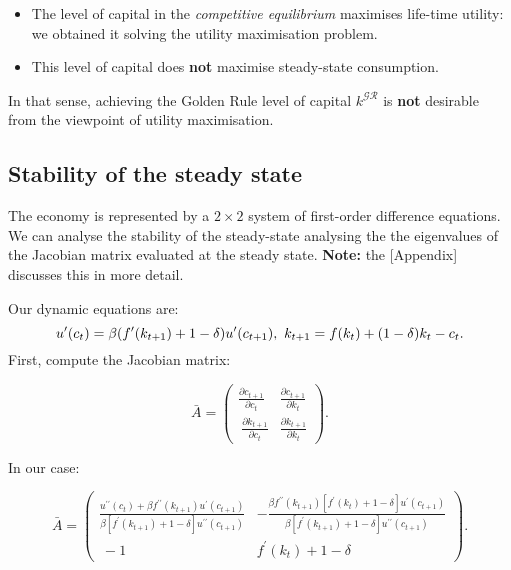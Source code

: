 \documentclass[11pt,a4paper,english]{article}
\providecommand{\tightlist}{%
  \setlength{\itemsep}{0pt}\setlength{\parskip}{0pt}}
\begin{document}
\begin{itemize}
\tightlist
\item
  The level of capital in the \emph{competitive equilibrium} maximises
  life-time utility: we obtained it solving the utility maximisation
  problem.
\item
  This level of capital does \textbf{not} maximise steady-state
  consumption.
\end{itemize}

In that sense, achieving the Golden Rule level of capital
\(k^{\mathcal{GR}}\) is \textbf{not} desirable from the viewpoint of
utility maximisation.

\hypertarget{stability}{%
\subsection{Stability of the steady state}\label{stability}}

The economy is represented by a \(2 \times 2\) system of first-order
difference equations. We can analyse the stability of the steady-state
analysing the the eigenvalues of the Jacobian matrix evaluated at the
steady state. \textbf{Note:} the {[}Appendix{]} discusses this in more
detail.

Our dynamic equations are:
\[ u^{\prime}(c_{t}) = \beta (f^{\prime}(k_{t+1}) + 1 - \delta) u^{\prime}(c_{t+1}), \\\
   k_{t+1} = f(k_{t}) + (1-\delta) k_{t} - c_{t}.
\] First, compute the Jacobian matrix:

\[\bar{A} = \begin{pmatrix}
\frac{\partial c_{t+1}}{\partial c_{t}} & \frac{\partial c_{t+1}}{\partial k_{t}} \\\
\frac{\partial k_{t+1}}{\partial c_{t}} & \frac{\partial k_{t+1}}{\partial k_{t}}
\end{pmatrix}.\]

In our case:

\[\bar{A} = \begin{pmatrix}
\frac{u^{\prime \prime}(c_{t})+\beta f^{\prime \prime}(k_{t+1})u^{\prime}(c_{t+1})}{\beta \left[ f^{\prime}(k_{t+1}) + 1 - \delta \right] u^{\prime \prime}(c_{t+1})} & -\frac{\beta f^{\prime \prime}(k_{t+1}) \left[ f^{\prime}(k_{t}) + 1 - \delta \right] u^{\prime}(c_{t+1})}{\beta \left[ f^{\prime}(k_{t+1}) + 1 - \delta \right] u^{\prime \prime}(c_{t+1})} \\\
-1 & f^{\prime}(k_{t}) + 1 - \delta
\end{pmatrix}.\]
\end{document}
